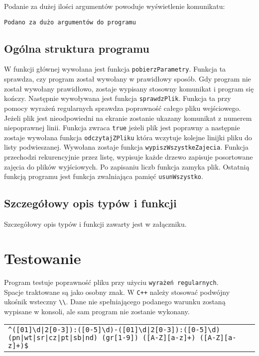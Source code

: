 \documentclass[12pt,a4paper,twoside]{article}
\let\oldmarginpar\marginpar
\renewcommand\marginpar[1]{%
  {\linespread{0.85}\normalfont\scriptsize%
\oldmarginpar[\hspace{1cm}\begin{minipage}{3cm}\raggedleft\scriptsize\color{black}\textsf{#1}\end{minipage}]%
{\hspace{0cm}\begin{minipage}{3cm}\raggedright\scriptsize\color{black}\textsf{#1}\end{minipage}}%
}%
}
\begin{document}
Podanie za dużej ilości argumentów powoduje wyświetlenie komunikatu:
\begin{verbatim}
Podano za dużo argumentów do programu
\end{verbatim}




\subsection{Ogólna struktura programu}
\marginpar{}
W funkcji głównej wywołana jest funkcja \lstinline|pobierzParametry|.
Funkcja ta sprawdza, czy program został wywołany w prawidłowy sposób. Gdy program nie został wywołany prawidłowo, zostaje wypisany stosowny komunikat i program się kończy.
Następnie wywoływana jest funkcja \lstinline|sprawdzPlik|.
Funkcja ta przy pomocy wyrażeń regularnych sprawdza poprawność całego pliku wejściowego. Jeżeli plik jest nieodpowiedni na ekranie zostanie ukazany komunikat z numerem niepoprawnej linii.
Funkcja zwraca \texttt{true} jeżeli plik jest poprawny a następnie zostaje wywołana funkcja \lstinline|odczytajZPliku| która wczytuje kolejne linijki pliku do listy podwieszanej.
Wywołana zostaje funkcja \lstinline|wypiszWszystkeZajecia|.
Funkcja przechodzi rekurencyjnie przez listę, wypisuje każde drzewo zapisuje posortowane zajęcia do plików wyjściowych. Po zapisaniu liczb funkcja zamyka plik. 
Ostatnią funkcją programu jest funkcja zwalniająca pamięć \lstinline|usunWszystko|.


\subsection{Szczegółowy opis typów i funkcji}

Szczegółowy opis typów i funkcji zawarty jest w załączniku. 

\section{Testowanie}
\marginpar{}

Program testuje poprawność pliku przy użyciu \texttt{wyrażeń regularnych}. \\
Spacje traktowane są jako osobny znak. W \texttt{C++} należy stosować podwójny ukośnik wsteczny \lstinline|\\|. Dane nie spełniającego podanego warunku zostaną wypisane w konsoli, ale sam program nie zostanie wykonany. \newline \newline
\begin{tabular}{ll}
\tiny \verb/^([01]\d|2[0-3]):([0-5]\d)-([01]\d|2[0-3]):([0-5]\d) (pn|wt|sr|cz|pt|sb|nd) (gr[1-9]) ([A-Z][a-z]+) ([A-Z][a-z]+)$/  
\end{tabular} \newline
\end{document}
